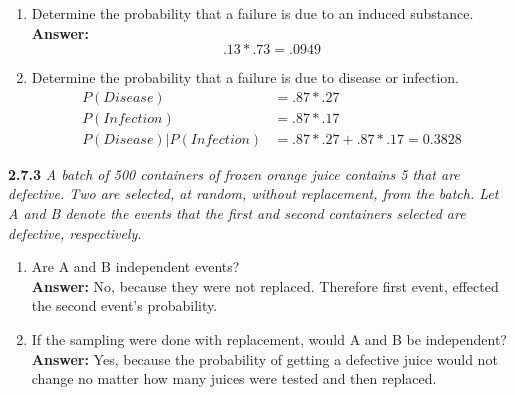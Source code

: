 \documentclass[11pt]{article}
\begin{document}
\begin{enumerate}
\item Determine the probability that a failure is due to an induced substance.
\\\textbf{Answer: } 
\begin{equation}
.13 * .73 = .0949
\end{equation}
\item Determine the probability that a failure is due to disease or infection. 
\begin{equation}
\begin{split}
P(Disease) &= .87*.27 \\
P(Infection) &= .87 * .17\\
P(Disease)|P(Infection) &= .87*.27 + .87*.17 = 0.3828
\end{split}
\end{equation}
\end{enumerate}
\noindent \textbf{2.7.3} \emph{A batch of 500 containers of frozen orange juice contains 5 that are defective. Two are selected, at random, without replacement, from the batch. Let A and B denote the events that the first and second containers selected are defective, respectively.}
\begin{enumerate}
\item Are A and B independent events?
\\\textbf{Answer: } No, because they were not replaced. Therefore first event, effected the second event's probability.
\item If the sampling were done with replacement, would A and B be independent?
\\\textbf{Answer: } Yes, because the probability of getting a defective juice would not change no matter how many juices were tested and then replaced.
\end{enumerate}
\end{document}
